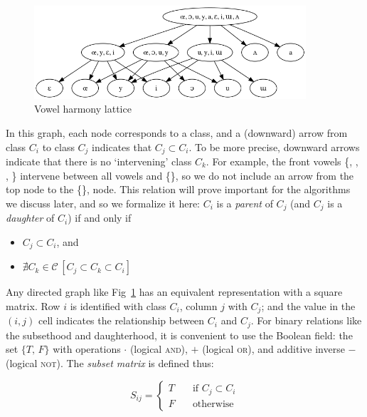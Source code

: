\documentclass[11pt, oneside]{article}   	%
\begin{document}
\begin{figure}[h]
\includegraphics[width=0.9\textwidth]{vowelHarmony_unicode.png}
\caption{Vowel harmony lattice}
\label{fig:lattice}
\end{figure}

In this graph, each node corresponds to a class, and a (downward) arrow from class $C_i$ to class $C_j$ indicates that $C_j \subset C_i$. To be more precise, downward arrows indicate that there is no `intervening' class $C_k$. For example, the front vowels \{, , , \} intervene between all vowels and \{\}, so we do not include an arrow from the top node to the \{\}, node. This relation will prove important for the algorithms we discuss later, and so we formalize it here: $C_i$ is a \textit{parent} of $C_j$ (and $C_j$ is a \textit{daughter} of $C_i$) if and only if \begin{itemize}
    \item $C_j \subset C_i$, and
    \item $\nexists C_k \in \mathcal C \, [C_j \subset C_k \subset C_i]$
    \end{itemize}

\vspace{\baselineskip} Any directed graph like Fig~\ref{fig:lattice} has an equivalent representation with a square matrix. Row $i$ is identified with class $C_i$, column $j$ with $C_j$; and the value in the $(i,j)$ cell indicates the relationship between $C_i$ and $C_j$. For binary relations like the subsethood and daughterhood, it is convenient to use the Boolean field: the set $\{T, \, F\}$ with operations $\cdot$ (logical \textsc{and}), $+$ (logical \textsc{or}), and additive inverse $-$ (logical \textsc{not}). The \textit{subset matrix} is defined thus:

$$S_{ij} = \begin{cases}
                T & \quad \text{if } C_j \subset C_i \\
                F & \quad \text{otherwise}
                \end{cases}$$
\end{document}
